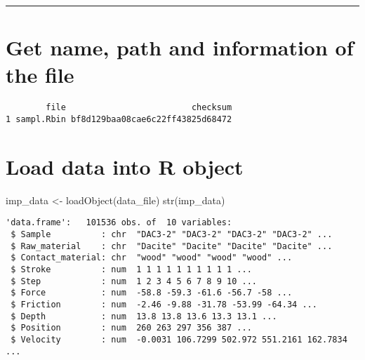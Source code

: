 \documentclass[
]{article}
\newenvironment{Shaded}{\begin{snugshade}}{\end{snugshade}}
\newcommand{\AttributeTok}[1]{\textcolor[rgb]{0.77,0.63,0.00}{#1}}
\newcommand{\ConstantTok}[1]{\textcolor[rgb]{0.00,0.00,0.00}{#1}}
\newcommand{\FunctionTok}[1]{\textcolor[rgb]{0.00,0.00,0.00}{#1}}
\newcommand{\NormalTok}[1]{#1}
\newcommand{\OtherTok}[1]{\textcolor[rgb]{0.56,0.35,0.01}{#1}}
\newcommand{\SpecialCharTok}[1]{\textcolor[rgb]{0.00,0.00,0.00}{#1}}
\newcommand{\StringTok}[1]{\textcolor[rgb]{0.31,0.60,0.02}{#1}}
\begin{document}
\begin{center}\rule{0.5\linewidth}{0.5pt}\end{center}

\hypertarget{get-name-path-and-information-of-the-file}{%
\section{Get name, path and information of the
file}\label{get-name-path-and-information-of-the-file}}

\begin{Shaded}
\end{Shaded}

\begin{verbatim}
        file                         checksum
1 sampl.Rbin bf8d129baa08cae6c22ff43825d68472
\end{verbatim}

\hypertarget{load-data-into-r-object}{%
\section{Load data into R object}\label{load-data-into-r-object}}

\begin{Shaded}
\begin{Highlighting}[]
\NormalTok{imp\_data }\OtherTok{\textless{}{-}} \FunctionTok{loadObject}\NormalTok{(data\_file)}
\FunctionTok{str}\NormalTok{(imp\_data)}
\end{Highlighting}
\end{Shaded}

\begin{verbatim}
'data.frame':   101536 obs. of  10 variables:
 $ Sample          : chr  "DAC3-2" "DAC3-2" "DAC3-2" "DAC3-2" ...
 $ Raw_material    : chr  "Dacite" "Dacite" "Dacite" "Dacite" ...
 $ Contact_material: chr  "wood" "wood" "wood" "wood" ...
 $ Stroke          : num  1 1 1 1 1 1 1 1 1 1 ...
 $ Step            : num  1 2 3 4 5 6 7 8 9 10 ...
 $ Force           : num  -58.8 -59.3 -61.6 -56.7 -58 ...
 $ Friction        : num  -2.46 -9.88 -31.78 -53.99 -64.34 ...
 $ Depth           : num  13.8 13.8 13.6 13.3 13.1 ...
 $ Position        : num  260 263 297 356 387 ...
 $ Velocity        : num  -0.0031 106.7299 502.972 551.2161 162.7834 ...
\end{verbatim}
\end{document}
